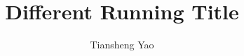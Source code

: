 \documentclass{article}
\begin{document}
 \selectfont

\def\mytitle{Different Running Title}
\title{\mytitle}
\author{Tiansheng Yao}
\maketitle





\end{document}
